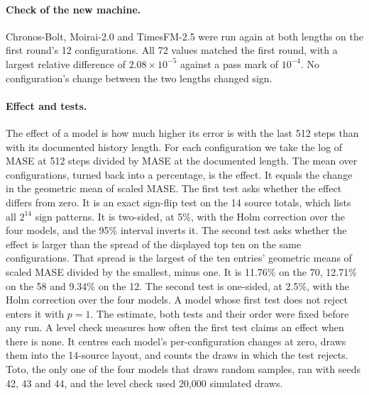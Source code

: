 \documentclass{article}
\begin{document}
\paragraph{Check of the new machine.} Chronos-Bolt, Moirai-2.0 and TimesFM-2.5 were run again
at both lengths on the first round's 12 configurations. All 72 values matched the first round,
with a largest relative difference of $2.08\times10^{-5}$ against a pass mark of $10^{-4}$. No
configuration's change between the two lengths changed sign.

\paragraph{Effect and tests.} The effect of a model is how much higher its error is with the
last 512 steps than with its documented history length. For each configuration we take the log
of MASE at 512 steps divided by MASE at the documented length. The mean over configurations,
turned back into a percentage, is the effect. It equals the change in the geometric mean of
scaled MASE. The first test asks whether the effect differs from zero. It is an exact sign-flip
test on the 14 source totals, which lists all $2^{14}$ sign patterns. It is two-sided, at 5\%,
with the Holm correction over the four models, and the 95\% interval inverts it. The second
test asks whether the effect is larger than the spread of the displayed top ten on the same
configurations. That spread is the largest of the ten entries' geometric means of scaled MASE
divided by the smallest, minus one. It is 11.76\% on the 70, 12.71\% on the 58 and 9.34\% on
the 12. The second test is one-sided, at 2.5\%, with the Holm correction over the four models.
A model whose first test does not reject enters it with $p = 1$. The estimate, both tests and
their order were fixed before any run. A level check measures how often the first test claims
an effect when there is none. It centres each model's per-configuration changes at zero, draws
them into the 14-source layout, and counts the draws in which the test rejects. Toto, the only
one of the four models that draws random samples, ran with seeds 42, 43 and 44, and the level
check used 20,000 simulated draws.
\end{document}
